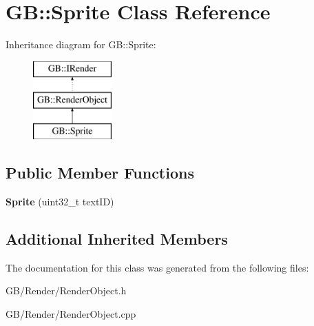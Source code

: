 \hypertarget{class_g_b_1_1_sprite}{}\section{GB\+::Sprite Class Reference}
\label{class_g_b_1_1_sprite}
Inheritance diagram for GB\+::Sprite\+:\begin{figure}[H]
\begin{center}
\leavevmode
\includegraphics[height=3.000000cm]{class_g_b_1_1_sprite}
\end{center}
\end{figure}
\subsection*{Public Member Functions}
\begin{DoxyCompactItemize}
\item 
\mbox{\label{class_g_b_1_1_sprite_a2e9f8f7b12cb0141d6d178382c5f78f0}} 
{\bfseries Sprite} (uint32\+\_\+t text\+ID)
\end{DoxyCompactItemize}
\subsection*{Additional Inherited Members}


The documentation for this class was generated from the following files\+:\begin{DoxyCompactItemize}
\item 
G\+B/\+Render/Render\+Object.\+h\item 
G\+B/\+Render/Render\+Object.\+cpp\end{DoxyCompactItemize}
